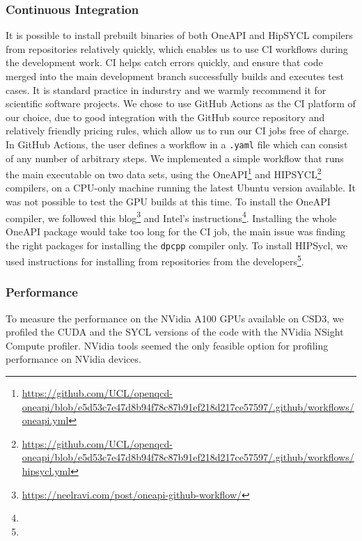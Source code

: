 \documentclass[../main]{subfiles}
\begin{document}

\subsubsection{Continuous Integration}

It is possible to install prebuilt binaries of both OneAPI and HipSYCL compilers from repositories relatively quickly, which enables us to use CI workflows during the development work.
CI helps catch errors quickly, and ensure that code merged into the main development branch successfully builds and executes test cases.
It is standard practice in indurstry and we warmly recommend it for scientific software projects.
We chose to use GitHub Actions as the CI platform of our choice, due to good integration with the GitHub source repository and relatively friendly pricing rules, which allow us to run our CI jobs free of charge.
In GitHub Actions, the user defines a workflow in a \verb #.yaml# file which can consist of any number of arbitrary steps.
We implemented a simple workflow that runs the main executable on two data sets, using the OneAPI\footnote{\url{https://github.com/UCL/openqcd-oneapi/blob/e5d53c7e47d8b94f78c87b91ef218d217ce57597/.github/workflows/oneapi.yml}} and HIPSYCL\footnote{\url{https://github.com/UCL/openqcd-oneapi/blob/e5d53c7e47d8b94f78c87b91ef218d217ce57597/.github/workflows/hipsycl.yml}} compilers, on a CPU-only machine running the latest Ubuntu version available.
It was not possible to test the GPU builds at this time.
To install the OneAPI compiler, we followed this blog\footnote{\url{https://neelravi.com/post/oneapi-github-workflow/}} and Intel's instructions\footnote{\oneapiaptinstall}.
Installing the whole OneAPI package would take too long for the CI job, the main issue was finding the right packages for installing the \verb #dpcpp# compiler only.
To install HIPSycl, we used instructions for installing from repositories from the developers\footnote{\hipsyclinstallfromrepos}.

\subsubsection{Performance}\label{sec:openqcd_performance}

To measure the performance on the NVidia A100 GPUs available on CSD3, we profiled the CUDA and the SYCL versions of the code with the NVidia NSight Compute profiler.
NVidia tools seemed the only feasible option for profiling performance on NVidia devices.
\end{document}
